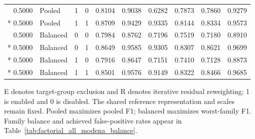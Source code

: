 \begin{longtable}{@{}rlccrrrrrr@{}}
0.5000 & Pooled & 1 & 0 & 0.8104 & 0.9038 & 0.6282 & 0.7873 & 0.7860 & 0.9279 \\*
0.5000 & Pooled & 1 & 1 & 0.8709 & 0.9429 & 0.9335 & 0.8144 & 0.8334 & 0.9573 \\
\midrule
0.5000 & Balanced & 0 & 0 & 0.7984 & 0.8762 & 0.7196 & 0.7519 & 0.7180 & 0.8910 \\*
0.5000 & Balanced & 0 & 1 & 0.8649 & 0.9585 & 0.9305 & 0.8307 & 0.8621 & 0.9699 \\*
0.5000 & Balanced & 1 & 0 & 0.7916 & 0.8647 & 0.7151 & 0.7410 & 0.7128 & 0.8873 \\*
0.5000 & Balanced & 1 & 1 & 0.8501 & 0.9576 & 0.9149 & 0.8322 & 0.8466 & 0.9685 \\
\end{longtable}
\noindent\footnotesize E denotes target-group exclusion and R denotes iterative residual reweighting; 1 is enabled and 0 is disabled. The shared reference representation and scales remain fixed. Pooled maximizes pooled F1; balanced maximizes worst-family F1. Family balance and achieved false-positive rates appear in Table~\ref{tab:factorial_all_modena_balance}.
\par\endgroup
